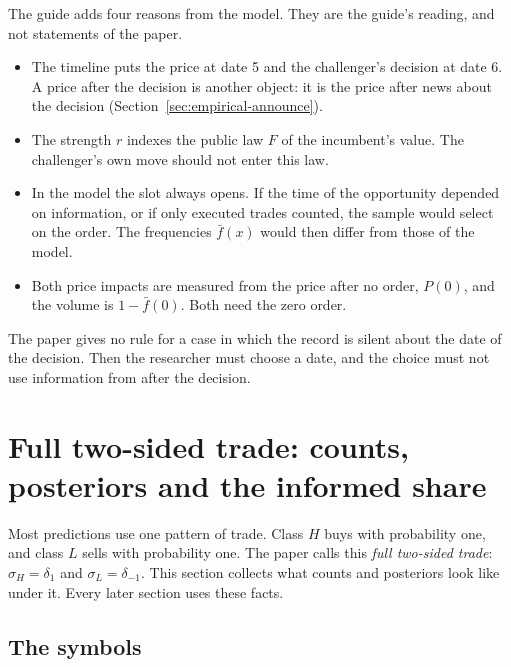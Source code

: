 The guide adds four reasons from the model. They are the guide's reading, and not statements of the paper.
\begin{itemize}
\item The timeline puts the price at date 5 and the challenger's decision at date 6. A price after the decision is another object: it is the price after news about the decision (Section~\ref{sec:empirical-announce}).
\item The strength \(r\) indexes the public law \(F\) of the incumbent's value. The challenger's own move should not enter this law.
\item In the model the slot always opens. If the time of the opportunity depended on information, or if only executed trades counted, the sample would select on the order. The frequencies \(\bar f(x)\) would then differ from those of the model.
\item Both price impacts are measured from the price after no order, \(P(0)\), and the volume is \(1-\bar f(0)\). Both need the zero order.
\end{itemize}

The paper gives no rule for a case in which the record is silent about the date of the decision. Then the researcher must choose a date, and the choice must not use information from after the decision.

\section{Full two-sided trade: counts, posteriors and the informed share}\label{sec:empirical-full}

Most predictions use one pattern of trade. Class \(H\) buys with probability one, and class \(L\) sells with probability one. The paper calls this \emph{full two-sided trade}: \(\sigma_H=\delta_1\) and \(\sigma_L=\delta_{-1}\). This section collects what counts and posteriors look like under it. Every later section uses these facts.

\subsection{The symbols}

